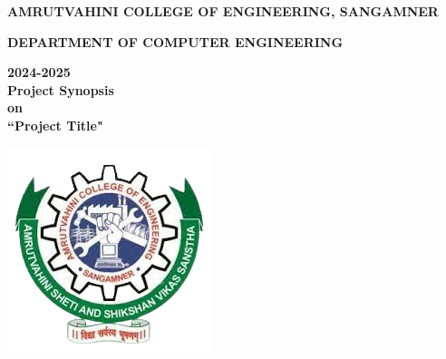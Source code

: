 \documentclass[12pt]{report}	%
\begin{document}




 \begin{center}
{\large \bf{  AMRUTVAHINI COLLEGE OF ENGINEERING, SANGAMNER}}\\ 
		\begin{small}
		{ \bf DEPARTMENT OF COMPUTER ENGINEERING}\\ 
		\end{small}
		\small{\bf{2024-2025}}\\
        {\large \bf {Project Synopsis  }} \\
        {\large \bf {on  }} \\
        
\large {\bf ``Project Title"}
       \end{center}
       \begin{center}
\includegraphics[scale=0.5]{AVCOE_LOGO.png} 
\end{center}
\end{document}
